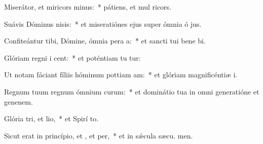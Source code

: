 \item Miserátor, et miricors minus:~* pátiens, et mul ricors.
\item Suávis Dóminus nisis:~* et miseratiónes ejus super ómnia ó jus.
\item Confiteántur tibi, Dómine, ómnia pera a:~* et sancti tui bene bi.
\item Glóriam regni i cent:~* et poténtiam tu tur:
\item Ut notam fáciant fíliis hóminum pottiam am:~* et glóriam magnificéntiæ  i.
\item Regnum tuum regnum ómnium curum:~* et dominátio tua in omni generatióne et genenem.
\item Glória tri, et lio,~* et Spirí to.
\item Sicut erat in princípio, et , et per,~* et in sǽcula sæcu. men.
